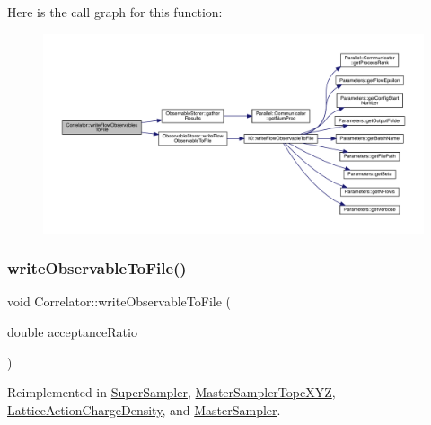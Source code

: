 Here is the call graph for this function\+:\nopagebreak
\begin{figure}[H]
\begin{center}
\leavevmode
\includegraphics[width=350pt]{class_correlator_a168512b2ce182d9478db47f100125fa6_cgraph}
\end{center}
\end{figure}
\mbox{\label{class_correlator_a9e8d80e30e4fbe3b7fe57521538cb5ff}} 
\subsubsection{\texorpdfstring{writeObservableToFile()}{writeObservableToFile()}}
{\footnotesize\ttfamily void Correlator\+::write\+Observable\+To\+File (\begin{DoxyParamCaption}\item[{double}]{acceptance\+Ratio }\end{DoxyParamCaption})\hspace{0.3cm}{\ttfamily [virtual]}}



Reimplemented in \mbox{\hyperlink{class_super_sampler_a05b42b82879233dc329d280a61bfd7f0}{Super\+Sampler}}, \mbox{\hyperlink{class_master_sampler_topc_x_y_z_a930f13a2a13f4b3820f40c8b52110cf2}{Master\+Sampler\+Topc\+X\+YZ}}, \mbox{\hyperlink{class_lattice_action_charge_density_a719f71aaccbf1b4147ea944781d69908}{Lattice\+Action\+Charge\+Density}}, and \mbox{\hyperlink{class_master_sampler_a638714c38e1a6252ab8b6be1fa224bd4}{Master\+Sampler}}.

